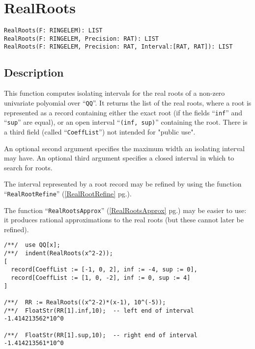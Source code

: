 \documentclass[a4paper]{mybook}
\newenvironment{command}{}{} %
\begin{document}
\section{RealRoots}
\label{RealRoots}
\begin{command} %


\begin{Verbatim}[label=syntax, rulecolor=\color{MidnightBlue},
frame=single]
RealRoots(F: RINGELEM): LIST
RealRoots(F: RINGELEM, Precision: RAT): LIST
RealRoots(F: RINGELEM, Precision: RAT, Interval:[RAT, RAT]): LIST
\end{Verbatim}


\subsection*{Description}

This function computes isolating intervals for the real roots of a
non-zero univariate polyomial over ``\verb&QQ&''.  It returns the list of the
real roots, where a root is represented as a record containing either
the exact root (if the fields ``\verb&inf&'' and ``\verb&sup&'' are equal), or an open
interval ``\verb&(inf, sup)&'' containing the root.  There is a third field
(called ``\verb&CoeffList&'') not intended for "public use".
\par 
An optional second argument specifies the maximum width an isolating
interval may have.  An optional third argument specifies a closed
interval in which to search for roots.
\par 
The interval represented by a root record may be refined by using the
function ``\verb&RealRootRefine&'' (\ref{RealRootRefine} pg.\pageref{RealRootRefine}).
\par 
The function ``\verb&RealRootsApprox&'' (\ref{RealRootsApprox} pg.\pageref{RealRootsApprox}) may be easier to use:
it produces rational approximations to the real roots (but these
cannot later be refined).
\begin{Verbatim}[label=example, rulecolor=\color{PineGreen}, frame=single]
/**/  use QQ[x];
/**/  indent(RealRoots(x^2-2));
[
  record[CoeffList := [-1, 0, 2], inf := -4, sup := 0],
  record[CoeffList := [1, 0, -2], inf := 0, sup := 4]
]

/**/  RR := RealRoots((x^2-2)*(x-1), 10^(-5));
/**/  FloatStr(RR[1].inf,10);  -- left end of interval
-1.414213562*10^0

/**/  FloatStr(RR[1].sup,10);  -- right end of interval
-1.414213561*10^0


\end{Verbatim}
\end{command}
\end{document}
